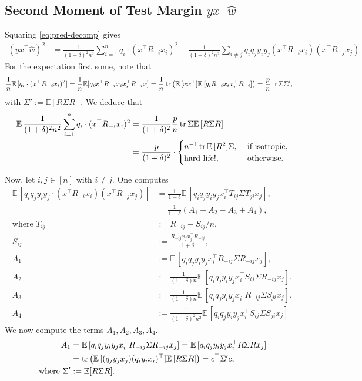 \subsection{Second Moment of Test Margin $yx^\top \hat w$}
Squaring \eqref{eq:pred-decomp} gives
\begin{align*}
(yx^\top \hat w)^2 &= \frac{1}{(1+\delta)^2n^2}\sum_{i=1}^n q_i\cdot (x^\top R_{-i} x_i)^2 + \frac{1}{(1+\delta)^2n^2}\sum_{i \ne j} q_iq_jy_iy_j (x^\top R_{-i} x_i)(x^\top R_{-j} x_j)
\end{align*}
For the expectation first some, note that
\begin{align*}
\frac{1}{n}\mathbb E\,[q_i \cdot (x^\top R_{-i} x_i)^2] = \frac{1}{n}\mathbb E[q_i x^\top R_{-i} x_ix_i^\top R_{-i}x]&= \frac{1}{n}\operatorname{tr}\left(\mathbb E\,[xx^\top]\mathbb E\,[q_i R_{-i}x_ix_i^\top R_{-i}]\right)= \frac{p}{n}\operatorname{tr}\Sigma \Sigma',
\end{align*}
with $\Sigma':= \mathbb E[R\Sigma R]$. We deduce that
\begin{align*}
\mathbb E\,\frac{1}{(1+\delta)^2n^2}\sum_{i=1}^n q_i\cdot (x^\top R_{-i} x_i)^2 &= \frac{1}{(1+\delta)^2}\frac{p}{n}\operatorname{tr} \Sigma \mathbb E\,[R \Sigma R]\nonumber\\
&= \frac{p}{(1+\delta)^2}\cdot \begin{cases}
n^{-1}\operatorname{tr} \mathbb E\,[R^2] \Sigma,&\mbox{ if isotropic},\\
\text{hard life!},&\mbox{ otherwise.}
\end{cases}
\end{align*}

Now, let $i,j \in [n]$ with $i \ne j$. One computes
\begin{align*}
\mathbb E\,[q_iq_jy_iy_j \cdot (x^\top R_{-i} x_i)(x^\top R_{-j} x_j)]
&= \frac{1}{1+\delta}\mathbb E\,\left[q_i q_j y_i y_jx_i^\top T_{ij}\Sigma T_{ji}x_j\right],\\
&= \frac{1}{1+\delta}(A_1-A_2-A_3+A_4),\\
\text{where }
T_{ij} &:= R_{-ij}-S_{ij}/n,\\
S_{ij} &:= \frac{R_{-ij}x_jx_j^\top R_{-ij}}{1+\delta},\\
A_1 &:= \mathbb E\,[q_iq_jy_iy_jx_i^\top R_{-ij}\Sigma R_{-ij}x_j],\\
A_2 &:= \frac{1}{(1+\delta)n}\mathbb E\,[q_iq_jy_iy_jx_i^\top S_{ij}\Sigma R_{-ij}x_j],\\
A_3 &:= \frac{1}{(1+\delta)n}\mathbb E\,[q_iq_jy_iy_jx_i^\top R_{-ij}\Sigma S_{ji}x_j],\\
A_4 &:= \frac{1}{(1+\delta)^2n^2}\mathbb E\,[q_iq_jy_i y_jx_i^\top S_{ij}\Sigma S_{ji}x_j]
\end{align*}
We now compute the terms $A_1,A_2,A_3,A_4$.
\begin{align*}
A_1 &= \mathbb E\,[q_iq_jy_iy_jx_i^\top R_{-ij}\Sigma R_{-ij}x_j] = \mathbb E\,[q_iq_jy_iy_jx_i^\top R\Sigma R x_j]\\
&= \operatorname{tr}\left(\mathbb E\,[(q_j y_j x_j)(q_iy_ix_i)^\top]\mathbb E\,[R\Sigma R]\right)= c^\top \Sigma' c,\\
\text{where }
\Sigma' &:= \mathbb E[R\Sigma R].
\end{align*}

